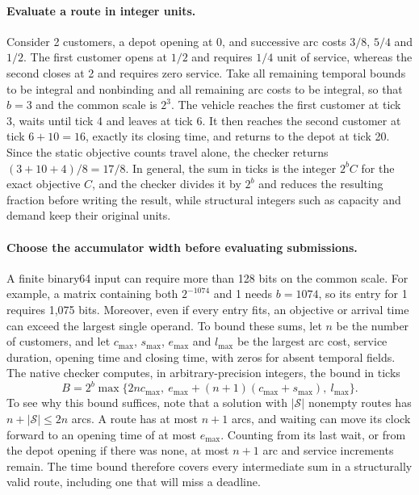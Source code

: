 \paragraph{Evaluate a route in integer units.}
Consider 2 customers, a depot opening at 0, and successive arc costs $3/8$, $5/4$ and $1/2$. The first customer opens at $1/2$ and requires $1/4$ unit of service, whereas the second closes at 2 and requires zero service. Take all remaining temporal bounds to be integral and nonbinding and all remaining arc costs to be integral, so that $b=3$ and the common scale is $2^3$. The vehicle reaches the first customer at tick 3, waits until tick 4 and leaves at tick 6. It then reaches the second customer at tick $6+10=16$, exactly its closing time, and returns to the depot at tick 20. Since the static objective counts travel alone, the checker returns $(3+10+4)/8=17/8$. In general, the sum in ticks is the integer $2^bC$ for the exact objective $C$, and the checker divides it by $2^b$ and reduces the resulting fraction before writing the result, while structural integers such as capacity and demand keep their original units.

\paragraph{Choose the accumulator width before evaluating submissions.}
A finite binary64 input can require more than 128 bits on the common scale. For example, a matrix containing both $2^{-1074}$ and 1 needs $b=1074$, so its entry for 1 requires 1,075 bits. Moreover, even if every entry fits, an objective or arrival time can exceed the largest single operand. To bound these sums, let $n$ be the number of customers, and let $c_{\max}$, $s_{\max}$, $e_{\max}$ and $l_{\max}$ be the largest arc cost, service duration, opening time and closing time, with zeros for absent temporal fields. The native checker computes, in arbitrary-precision integers, the bound in ticks
\[
 B=2^b\max\{2nc_{\max},\ e_{\max}+(n+1)(c_{\max}+s_{\max}),\ l_{\max}\}.
\]
To see why this bound suffices, note that a solution with $|\mathcal S|$ nonempty routes has $n+|\mathcal S|\leq2n$ arcs. A route has at most $n+1$ arcs, and waiting can move its clock forward to an opening time of at most $e_{\max}$. Counting from its last wait, or from the depot opening if there was none, at most $n+1$ arc and service increments remain. The time bound therefore covers every intermediate sum in a structurally valid route, including one that will miss a deadline.

